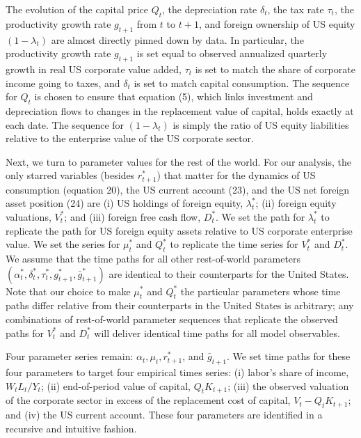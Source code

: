 \documentclass[11pt]{article}
\begin{document}
The evolution of the capital price $Q_{t}$, the depreciation rate $\delta _{t}$, the tax rate $\tau _{t}$, the productivity growth rate $g_{t+1}$ from $t$ to $t+1$, and foreign ownership of US equity $(1-\lambda _{t})$ are almost directly pinned down by data. In particular, the productivity growth rate $g_{t+1}$ is set equal to observed annualized quarterly growth in real US corporate value added, $\tau _{t}$ is set to match the share of corporate income going to taxes, and $\delta _{t}$ is set to match capital consumption. The sequence for $Q_{t}$ is chosen to ensure that equation (5), which links investment and depreciation flows to changes in the replacement value of capital, holds exactly at each date. The sequence for $(1-\lambda _{t})$ is simply the ratio of US equity liabilities relative to the enterprise value of the US corporate sector.


Next, we turn to parameter values for the rest of the world. For our analysis, the only starred variables (besides $r_{t+1}^{*}$) that matter for the dynamics of US consumption (equation 20), the US current account (23), and the US net foreign asset position (24) are (i) US holdings of foreign equity, $\lambda _{t}^{*}$; (ii) foreign equity valuations, $V_{t}^{*}$; and (iii) foreign free cash flow, $D_{t}^{*}$. We set the path for $\lambda _{t}^{*}$ to replicate the path for US foreign equity assets relative to US corporate enterprise value. We set the series for $\mu _{t}^{*}$ and $Q_{t}^{*}$ to replicate the time series for $V_{t}^{*}$ and $D_{t}^{*}$. We assume that the time paths for all other rest-of-world parameters $(\alpha _{t}^{*},\delta _{t}^{*},\tau _{t}^{*},g_{t+1}^{*},\bar{g}_{t+1}^{*})$ are identical to their counterparts for the United States. Note that our choice to make $\mu _{t}^{*}$ and $Q_{t}^{*}$ the particular parameters whose time paths differ relative from their counterparts in the United States is arbitrary; any combinations of rest-of-world parameter sequences that replicate the observed paths for $V_{t}^{*}$ and $D_{t}^{*}$ will deliver identical time paths for all model observables.


Four parameter series remain: $\alpha _{t},\mu _{t},r_{t+1}^{*}$, and $\bar{g}_{t+1}$. We set time paths for these four parameters to target four empirical times series: (i) labor’s share of income, $W_{t}L_{t}/Y_{t}$; (ii) end-of-period value of capital, $Q_{t}K_{t+1}$; (iii) the observed valuation of the corporate sector in excess of the replacement cost of capital, $V_{t}-Q_{t}K_{t+1}$; and (iv) the US current account. These four parameters are identified in a recursive and intuitive fashion.
\end{document}
